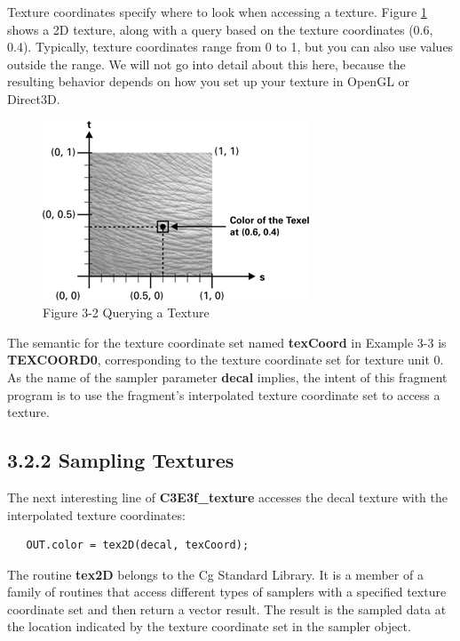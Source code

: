 \documentclass{book}
\begin{document}
Texture coordinates specify where to look when accessing a texture. Figure \ref{fig:3-2} shows a 2D texture, along with a query based on the texture coordinates (0.6, 0.4). Typically, texture coordinates range from 0 to 1, but you can also use values outside the range. We will not go into detail about this here, because the resulting behavior depends on how you set up your texture in OpenGL or Direct3D.

\begin{figure}
    \centering
    \includegraphics[width=1\linewidth]{Images/fig3_2.jpg}
    \caption{Figure 3-2 Querying a Texture}
    \label{fig:3-2}
\end{figure}

The semantic for the texture coordinate set named \textbf{texCoord} in Example 3-3 is \textbf{TEXCOORD0}, corresponding to the texture coordinate set for texture unit 0. As the name of the sampler parameter \textbf{decal} implies, the intent of this fragment program is to use the fragment's interpolated texture coordinate set to access a texture.

\subsection{3.2.2 Sampling Textures}

The next interesting line of \textbf{C3E3f_texture} accesses the decal texture with the interpolated texture coordinates:

\FloatBarrier
\begin{lstlisting}
   OUT.color = tex2D(decal, texCoord);
\end{lstlisting}
\FloatBarrier

The routine \textbf{tex2D} belongs to the Cg Standard Library. It is a member of a family of routines that access different types of samplers with a specified texture coordinate set and then return a vector result. The result is the sampled data at the location indicated by the texture coordinate set in the sampler object.
\end{document}
